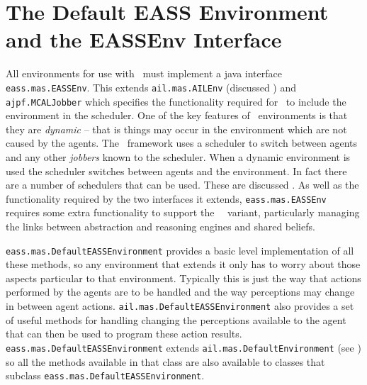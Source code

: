 \section{The Default EASS Environment and the EASSEnv Interface}
\begin{sloppypar}
All environments for use with \eass\ must implement a java interface \texttt{eass.mas.EASSEnv}.  This extends \texttt{ail.mas.AILEnv} (discussed ) and \texttt{ajpf.MCALJobber} which specifies the functionality required for \ajpf\ to include the environment in the scheduler.  One of the key features of \eass\ environments is that they are \emph{dynamic} -- that is things may occur in the environment which are not caused by the agents.  The \ajpf\ framework uses a scheduler to switch between agents and any other \emph{jobbers} known to the scheduler.  When a dynamic environment is used the scheduler switches between agents and the environment.  In fact there are a number of schedulers that can be used.  These are discussed .  As well as the functionality required by the two interfaces it extends, \texttt{eass.mas.EASSEnv} requires some extra functionality to support the \eass\ \gwendolen\ variant, particularly managing the links between abstraction and reasoning engines and shared beliefs.

\texttt{eass.mas.DefaultEASSEnvironment} provides a basic level implementation of all these methods, so any environment that extends it only has to worry about those aspects particular to that environment.  Typically this is just the way that actions performed by the agents are to be handled and the way perceptions may change in between agent actions.  \texttt{ail.mas.DefaultEASSEnvironment} also provides a set of useful methods for handling changing the perceptions available to the agent that can then be used to program these action results.  \texttt{eass.mas.DefaultEASSEnvironment} extends \texttt{ail.mas.DefaultEnvironment} (see ) so all the methods available in that class are also available to classes that subclass \texttt{eass.mas.DefaultEASSEnvironment}.
\end{sloppypar}

